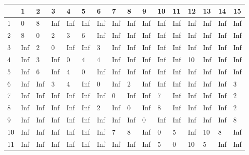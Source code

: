 \begin{table}[h!]
    \begin{tabular}{|l|lllllllllllllll|}
    \hline
    ~ & 1       & 2        &  3    &   4     &  5     &  6      & 7      &  8     & 9      & 10      & 11     & 12         &  13     & 14       &  15  \\
    \hline
    1 & 0       & 8        &  Inf    &   Inf     &  Inf     &  Inf      & Inf      &  Inf     & Inf      & Inf      & Inf     & Inf         &  Inf     & Inf       &  Inf  \\
    2 &8       & 0        & 2       &  3        &  6       &  Inf      & Inf      & Inf      & Inf      & Inf      & Inf     & Inf         &  Inf     &  Inf      &  Inf  \\
    3 & Inf     &  2       &  0      &  Inf      & Inf      &  3        &  Inf     &  Inf     & Inf      &  Inf     & Inf     &  Inf        &  Inf     &   Inf     & Inf   \\
    4 & Inf     &  3       &  Inf    &  0        & 4        & 4         & Inf      &  Inf     &  Inf     & Inf      & Inf     & 10          &  Inf     &  Inf      &  Inf  \\
    5 & Inf     &   6      &   Inf   &    4      &   0      & Inf       &  Inf     &  Inf     &   Inf    &   Inf    &    Inf  &     Inf     & Inf      & Inf       & Inf   \\
    6 & Inf     & Inf      &   3     & 4         &  Inf     &  0        &   Inf    &    2     & Inf      & Inf      & Inf     & Inf         & Inf      & Inf       & 3     \\
    7 & Inf     & Inf      &  Inf    &   Inf     &   Inf    &   Inf     & 0        & Inf      &  Inf     &  7       & Inf     & Inf         & Inf      & Inf       &  2    \\
    8 & Inf     & Inf      & Inf     & Inf       & Inf      & 2         & Inf      &  0       &  Inf     &  8       & Inf     &  Inf        &  Inf     & Inf       & 2     \\
    9 & Inf     &  Inf     & Inf     &   Inf     & Inf      & Inf       &  Inf     &  Inf     & 0        &  Inf     & Inf     & Inf         & Inf      & Inf       & 8     \\
    10 & Inf     &  Inf     & Inf     &  Inf      & Inf      &  Inf      & 7        &  8       &  Inf     &  0       & 5       & Inf         & 10       & 8         & Inf   \\
    11 & Inf     &  Inf     & Inf     & Inf       &  Inf     &  Inf      & Inf      & Inf      &  Inf     &   5      & 0       & 10          &  5       & Inf       & Inf   \\

\end{tabular}
\end{table}
